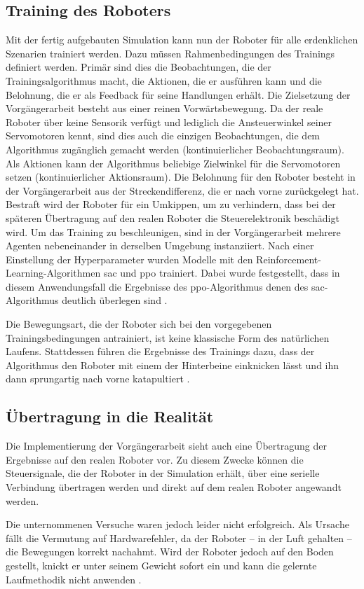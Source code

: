 \subsection{Training des Roboters}
Mit der fertig aufgebauten Simulation kann nun der Roboter für alle erdenklichen Szenarien trainiert werden.
Dazu müssen Rahmenbedingungen des Trainings definiert werden.
Primär sind dies die Beobachtungen, die der Trainingsalgorithmus macht, die Aktionen, die er ausführen kann und die Belohnung, die er als Feedback für seine Handlungen erhält.
Die Zielsetzung der Vorgängerarbeit besteht aus einer reinen Vorwärtsbewegung.
Da der reale Roboter über keine Sensorik verfügt und lediglich die Ansteuerwinkel seiner Servomotoren kennt, sind dies auch die einzigen Beobachtungen, die dem Algorithmus zugänglich gemacht werden (kontinuierlicher Beobachtungsraum).
Als Aktionen kann der Algorithmus beliebige Zielwinkel für die Servomotoren setzen (kontinuierlicher Aktionsraum).
Die Belohnung für den Roboter besteht in der Vorgängerarbeit aus der Streckendifferenz, die er nach vorne zurückgelegt hat.
Bestraft wird der Roboter für ein Umkippen, um zu verhindern, dass bei der späteren Übertragung auf den realen Roboter die Steuerelektronik beschädigt wird.
Um das Training zu beschleunigen, sind in der Vorgängerarbeit mehrere Agenten nebeneinander in derselben Umgebung instanziiert.
Nach einer Einstellung der Hyperparameter wurden Modelle mit den Reinforcement-Learning-Algorithmen \ac{sac} und \ac{ppo} trainiert.
Dabei wurde festgestellt, dass in diesem Anwendungsfall die Ergebnisse des \ac{ppo}-Algorithmus denen des \ac{sac}-Algorithmus deutlich überlegen sind \cite[48]{waidner.2020}.

Die Bewegungsart, die der Roboter sich bei den vorgegebenen Trainingsbedingungen antrainiert, ist keine klassische Form des natürlichen Laufens.
Stattdessen führen die Ergebnisse des Trainings dazu, dass der Algorithmus den Roboter mit einem der Hinterbeine einknicken lässt und ihn dann sprungartig nach vorne katapultiert \cite[51]{waidner.2020}.

\subsection{Übertragung in die Realität}
Die Implementierung der Vorgängerarbeit sieht auch eine Übertragung der Ergebnisse auf den realen Roboter vor.
Zu diesem Zwecke können die Steuersignale, die der Roboter in der Simulation erhält, über eine serielle Verbindung übertragen werden und direkt auf dem realen Roboter angewandt werden.

Die unternommenen Versuche waren jedoch leider nicht erfolgreich.
Als Ursache fällt die Vermutung auf Hardwarefehler, da der Roboter -- in der Luft gehalten -- die Bewegungen korrekt nachahmt.
Wird der Roboter jedoch auf den Boden gestellt, knickt er unter seinem Gewicht sofort ein und kann die gelernte Laufmethodik nicht anwenden \cite[58]{waidner.2020}.
